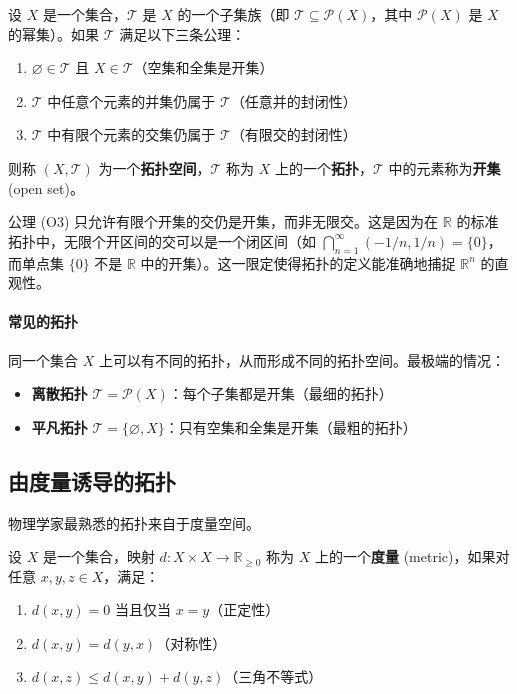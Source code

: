 \begin{definition}[拓扑空间]
设 $X$ 是一个集合，$\mathcal{T}$ 是 $X$ 的一个子集族（即 $\mathcal{T} \subseteq \mathcal{P}(X)$，其中 $\mathcal{P}(X)$ 是 $X$ 的幂集）。如果 $\mathcal{T}$ 满足以下三条公理：
\begin{enumerate}
    \item[(O1)] $\varnothing \in \mathcal{T}$ 且 $X \in \mathcal{T}$（空集和全集是开集）
    \item[(O2)] $\mathcal{T}$ 中任意个元素的并集仍属于 $\mathcal{T}$（任意并的封闭性）
    \item[(O3)] $\mathcal{T}$ 中有限个元素的交集仍属于 $\mathcal{T}$（有限交的封闭性）
\end{enumerate}
则称 $(X, \mathcal{T})$ 为一个\textbf{拓扑空间}，$\mathcal{T}$ 称为 $X$ 上的一个\textbf{拓扑}，$\mathcal{T}$ 中的元素称为\textbf{开集} (open set)。
\end{definition}

\begin{remark}[为什么有限交而非无限交？]
公理 (O3) 只允许有限个开集的交仍是开集，而非无限交。这是因为在 $\mathbb{R}$ 的标准拓扑中，无限个开区间的交可以是一个闭区间（如 $\bigcap_{n=1}^\infty (-1/n, 1/n) = \{0\}$，而单点集 $\{0\}$ 不是 $\mathbb{R}$ 中的开集）。这一限定使得拓扑的定义能准确地捕捉 $\mathbb{R}^n$ 的直观性。
\end{remark}

\paragraph{常见的拓扑}

同一个集合 $X$ 上可以有不同的拓扑，从而形成不同的拓扑空间。最极端的情况：
\begin{itemize}
    \item \textbf{离散拓扑} $\mathcal{T} = \mathcal{P}(X)$：每个子集都是开集（最细的拓扑）
    \item \textbf{平凡拓扑} $\mathcal{T} = \{\varnothing, X\}$：只有空集和全集是开集（最粗的拓扑）
\end{itemize}

\subsection{由度量诱导的拓扑}

物理学家最熟悉的拓扑来自于度量空间。

\begin{definition}[度量空间]
设 $X$ 是一个集合，映射 $d: X \times X \to \mathbb{R}_{\geq 0}$ 称为 $X$ 上的一个\textbf{度量} (metric)，如果对任意 $x, y, z \in X$，满足：
\begin{enumerate}
    \item $d(x, y) = 0$ 当且仅当 $x = y$（正定性）
    \item $d(x, y) = d(y, x)$（对称性）
    \item $d(x, z) \leq d(x, y) + d(y, z)$（三角不等式）
\end{enumerate}
\end{definition}

